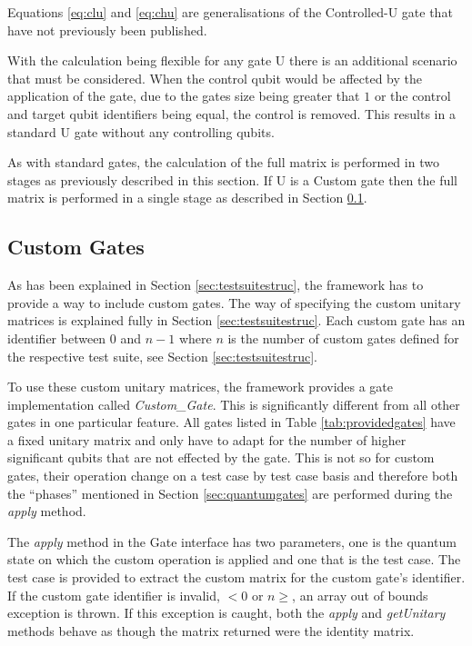 Equations \ref{eq:clu} and \ref{eq:chu} are generalisations of the Controlled-U gate that have not previously been published.

With the calculation being flexible for any gate U there is an additional  scenario that must be considered.
When the control qubit would be affected by the application of the gate, due to the gates size being greater that $1$ or the control and target qubit identifiers being equal, the control is removed.
This results in a standard U gate without any controlling qubits.

As with standard gates, the calculation of the full matrix is performed in two stages as previously described in this section.
If U is a Custom gate then the full matrix is performed in a single stage as described in Section \ref{sec:custgates}.

\subsection{Custom Gates}
\label{sec:custgates}

As has been explained in Section \ref{sec:testsuitestruc}, the framework has to provide a way to include custom gates.
The way of specifying the custom unitary matrices is explained fully in Section \ref{sec:testsuitestruc}.
Each custom gate has an identifier between $0$ and $n-1$ where $n$ is the number of custom gates defined for the respective test suite, see Section \ref{sec:testsuitestruc}.

To use these custom unitary matrices, the framework provides a gate implementation called \emph{Custom\_Gate}.
This is significantly different from all other gates in one particular feature.
All gates listed in Table \ref{tab:providedgates} have a fixed unitary matrix and only have to adapt for the number of higher significant qubits that are not effected by the gate.
This is not so for custom gates, their operation change on a test case by test case basis and therefore both the ``phases'' mentioned in Section \ref{sec:quantumgates} are performed during the \emph{apply} method.

The \emph{apply} method in the Gate interface has two parameters, one is the quantum state on which the custom operation is applied and one that is the test case.
The test case is provided to extract the custom matrix for the custom gate's identifier.
If the custom gate identifier is invalid, $<0$ or $n\geq$, an array out of bounds exception is thrown.
If this exception is caught, both the \emph{apply} and \emph{getUnitary} methods behave as though the matrix returned were the identity matrix.

